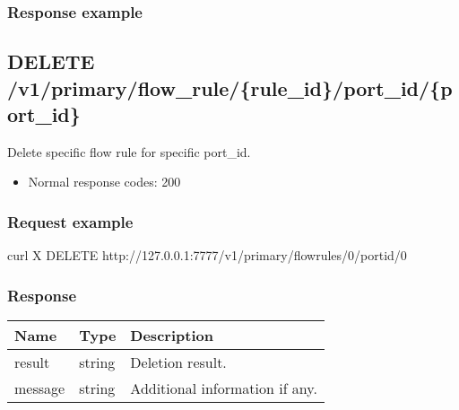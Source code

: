 \documentclass[a4paper,11pt,openany,oneside,english]{sphinxmanual}
\begin{document}
\subsubsection{Response example}
\label{\detokenize{api_ref/spp_primary:id29}}
\begin{sphinxVerbatim}[commandchars=\\\{\},formatcom=\footnotesize]
          
          
\end{sphinxVerbatim}


\subsection{DELETE /v1/primary/flow\_rule/\{rule\_id\}/port\_id/\{port\_id\}}
\label{\detokenize{api_ref/spp_primary:delete-v1-primary-flow-rule-rule-id-port-id-port-id}}
Delete specific flow rule for specific port\_id.
\begin{itemize}
\item {} 
Normal response codes: 200

\end{itemize}


\subsubsection{Request example}
\label{\detokenize{api_ref/spp_primary:id30}}
\begin{sphinxVerbatim}[commandchars=\\\{\},formatcom=\footnotesize]
 curl \PYGZhy{}X DELETE http://127.0.0.1:7777/v1/primary/flow\PYGZus{}rules/0/port\PYGZus{}id/0
\end{sphinxVerbatim}


\subsubsection{Response}
\label{\detokenize{api_ref/spp_primary:id31}}

\begin{savenotes}\sphinxattablestart
\centering
{}
\sphinxthecaptionisattop
{}\label{\detokenize{api_ref/spp_primary:id43}}\label{\detokenize{api_ref/spp_primary:table-spp-ctl-primary-flow-delete}}
\sphinxaftertopcaption
\begin{tabulary}{\linewidth}[t]{|T|T|T|}
\hline
\sphinxstyletheadfamily 
Name
&\sphinxstyletheadfamily 
Type
&\sphinxstyletheadfamily 
Description
\\
\hline
result
&
string
&
Deletion result.
\\
\hline
message
&
string
&
Additional information if any.
\\
\hline
\end{tabulary}
\par
\sphinxattableend\end{savenotes}
\end{document}
